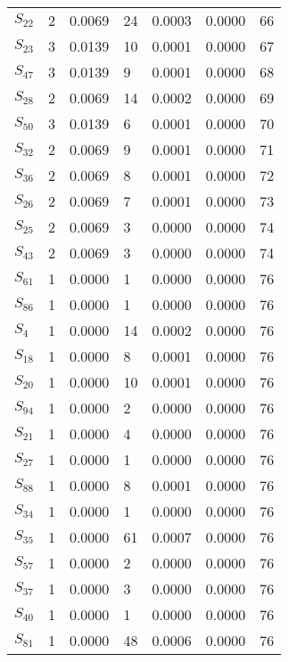\begin{xltabular}{\textwidth}{XPPPPPP}
  $S_{22}$ & 2 & 0.0069 & 24 & 0.0003 & 0.0000 & 66 \\ 
  $S_{23}$ & 3 & 0.0139 & 10 & 0.0001 & 0.0000 & 67 \\ 
  $S_{47}$ & 3 & 0.0139 & 9 & 0.0001 & 0.0000 & 68 \\ 
  $S_{28}$ & 2 & 0.0069 & 14 & 0.0002 & 0.0000 & 69 \\ 
  $S_{50}$ & 3 & 0.0139 & 6 & 0.0001 & 0.0000 & 70 \\ 
  $S_{32}$ & 2 & 0.0069 & 9 & 0.0001 & 0.0000 & 71 \\ 
  $S_{36}$ & 2 & 0.0069 & 8 & 0.0001 & 0.0000 & 72 \\ 
  $S_{26}$ & 2 & 0.0069 & 7 & 0.0001 & 0.0000 & 73 \\ 
  $S_{25}$ & 2 & 0.0069 & 3 & 0.0000 & 0.0000 & 74 \\ 
  $S_{43}$ & 2 & 0.0069 & 3 & 0.0000 & 0.0000 & 74 \\ 
  $S_{61}$ & 1 & 0.0000 & 1 & 0.0000 & 0.0000 & 76 \\ 
  $S_{86}$ & 1 & 0.0000 & 1 & 0.0000 & 0.0000 & 76 \\ 
  $S_{4}$ & 1 & 0.0000 & 14 & 0.0002 & 0.0000 & 76 \\ 
  $S_{18}$ & 1 & 0.0000 & 8 & 0.0001 & 0.0000 & 76 \\ 
  $S_{20}$ & 1 & 0.0000 & 10 & 0.0001 & 0.0000 & 76 \\ 
  $S_{94}$ & 1 & 0.0000 & 2 & 0.0000 & 0.0000 & 76 \\ 
  $S_{21}$ & 1 & 0.0000 & 4 & 0.0000 & 0.0000 & 76 \\ 
  $S_{27}$ & 1 & 0.0000 & 1 & 0.0000 & 0.0000 & 76 \\ 
  $S_{88}$ & 1 & 0.0000 & 8 & 0.0001 & 0.0000 & 76 \\ 
  $S_{34}$ & 1 & 0.0000 & 1 & 0.0000 & 0.0000 & 76 \\ 
  $S_{35}$ & 1 & 0.0000 & 61 & 0.0007 & 0.0000 & 76 \\ 
  $S_{57}$ & 1 & 0.0000 & 2 & 0.0000 & 0.0000 & 76 \\ 
  $S_{37}$ & 1 & 0.0000 & 3 & 0.0000 & 0.0000 & 76 \\ 
  $S_{40}$ & 1 & 0.0000 & 1 & 0.0000 & 0.0000 & 76 \\ 
  $S_{81}$ & 1 & 0.0000 & 48 & 0.0006 & 0.0000 & 76 \\ 

\end{xltabular}
